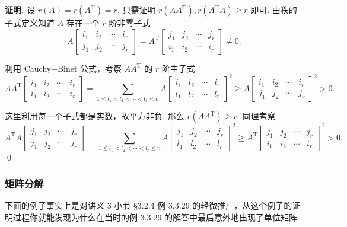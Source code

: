 \documentclass[10pt,openany]{article}
\theoremstyle{thmstyle} %
\theoremstyle{defstyle} %
\theoremstyle{prostyle} %
\theoremstyle{exastyle}
\theoremstyle{remstyle}
\renewenvironment{proof}[1][证明]{\par\underline{\textbf{#1.}} \;\fangsong}{\qed\par}
\newcommand{\T}{^{\text{T}}}
\begin{document}
\begin{proof}
	设 \( r(A)=r(A\T)=r \). 只需证明 \( r(AA\T), r(A\T A) \geq r \) 即可. 由秩的子式定义知道 \( A \) 存在一个 \( r \) 阶非零子式
	\[ A\begin{bmatrix}
		i_1 & i_2 & \cdots & i_r \\
		j_1 & j_2 & \cdots & j_r
	\end{bmatrix}=A\T \begin{bmatrix}
	j_1 & j_2 & \cdots & j_r \\
	i_1 & i_2 & \cdots & i_r
	\end{bmatrix} \neq 0. \]
	
	利用 Cauchy\(-\)Binet 公式，考察 \( AA\T \) 的 \( r \) 阶主子式
	\[ AA\T \begin{bmatrix}
		i_1 & i_2 & \cdots & i_r \\
		i_1 & i_2 & \cdots & i_r
	\end{bmatrix}= \sum_{1 \leq l_1<l_2<\cdots<l_r \leq n}^{} A\begin{bmatrix}
	i_1 & i_2 & \cdots & i_r \\
	l_1 & l_2 & \cdots & l_r
	\end{bmatrix}^2 \geq A\begin{bmatrix}
	i_1 & i_2 & \cdots & i_r \\
	j_1 & j_2 & \cdots & j_r
	\end{bmatrix}^2>0. \]
	
	这里利用每一个子式都是实数，故平方非负. 那么 \( r(AA\T) \geq r \). 同理考察
	\[ A\T A\begin{bmatrix}
		j_1 & j_2 & \cdots & j_r \\
		j_1 & j_2 & \cdots & j_r
	\end{bmatrix}= \sum_{1 \leq l_1<l_2<\cdots<l_r \leq n}^{} A\begin{bmatrix}
	j_1 & j_2 & \cdots & j_r \\
	l_1 & l_2 & \cdots & l_r
	\end{bmatrix}^2 \geq A\T \begin{bmatrix}
	j_1 & j_2 & \cdots & j_r \\
	i_1 & i_2 & \cdots & i_r
	\end{bmatrix}^2 >0. \]
\end{proof}

\subsubsection{矩阵分解}

下面的例子事实上是对讲义 3 小节 \S 3.2.4  例 3.3.29 的轻微推广，从这个例子的证明过程你就能发现为什么在当时的例 3.3.29 的解答中最后意外地出现了单位矩阵.
\end{document}
